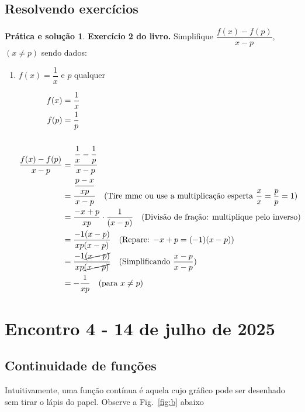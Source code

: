 \documentclass[12pt,openright,twoside,a4paper]{article}
\theoremstyle{definition}
\newtheorem{practice}{Prática e solução}[section]
\begin{document}
	
	
	\subsection{Resolvendo exercícios}
	
	\begin{practice}
		\textbf{Exercício 2 do livro.} Simplifique $\dfrac{f(x) - f(p)}{x - p}$, $(x \neq p)$ sendo dados:
		
		\begin{enumerate}
			\item[j)] $f(x) = \displaystyle \dfrac{1}{x}$ e $p$ qualquer
			
			\begin{align*}
				f(x) &= \dfrac{1}{x} \\
				f(p) &= \dfrac{1}{p} \\
				\\
				\dfrac{f(x) - f(p)}{x - p} &= \dfrac{\dfrac{1}{x} - \dfrac{1}{p}}{x - p} \\
				&= \dfrac{\dfrac{p - x}{xp}}{x - p} \quad \text{(Tire mmc ou use a multiplicação esperta $\dfrac{x}{x} = \dfrac{p}{p} = 1$)}\\
				&= \dfrac{-x + p}{xp}\cdot \dfrac{1}{(x - p)} \quad \text{(Divisão de fração: multiplique pelo inverso)}\\
				&= \dfrac{-1(x - p)}{xp(x - p)} \quad \text{(Repare: $-x + p = (-1)(x - p)$)}\\
				&= \dfrac{-1\cancel{(x - p)}}{xp \cancel{(x - p)}} \quad \text{(Simplificando $\dfrac{x-p}{x-p}$)}\\
				&= -\dfrac{1}{xp} \quad \text{(para } x \ne p\text{)}
			\end{align*}
			
		\end{enumerate}
	\end{practice}
	
	\pagebreak
	
	\section{Encontro 4 - 14 de julho de 2025}
	
	\subsection{Continuidade de funções}
	
	Intuitivamente, uma função contínua é aquela cujo gráfico pode ser desenhado sem tirar o lápis do papel. Observe a Fig.~\ref{fig:b} abaixo
	
\end{document}

